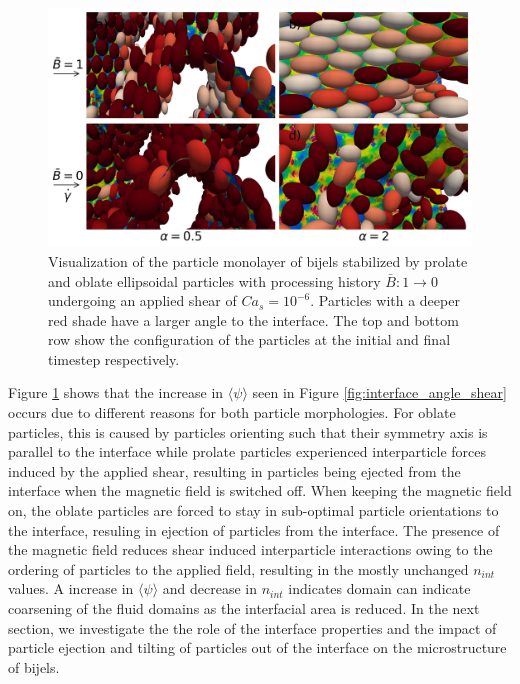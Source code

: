 \begin{figure} 
    \centering 
    \includegraphics[scale=0.4]{../figures/results/paper3/psi_concat_startB-1_endB-0.png} 
    \caption{Visualization of the particle monolayer of bijels stabilized by prolate and oblate ellipsoidal particles with processing history $\bar{B}: 1 \rightarrow 0$
             undergoing an applied shear of $Ca_s = 10^{-6}$. Particles with a deeper red shade have a larger angle to the interface. The top and bottom row show the 
             configuration of the particles at the initial and final timestep respectively.} 
    \label{fig:particle_viz_psi} 
\end{figure}

Figure \ref{fig:particle_viz_psi} shows that the increase in $\langle \psi \rangle$ seen in Figure \ref{fig:interface_angle_shear} occurs due to different
reasons for both particle morphologies. For oblate particles, this is caused by particles orienting such that their symmetry axis is parallel to the interface
while prolate particles experienced interparticle forces induced by the applied shear, resulting in particles being ejected from the interface when the magnetic 
field is switched off. When keeping the magnetic field on, the oblate particles are forced to stay in sub-optimal particle orientations to the interface, resuling
in ejection of particles from the interface. The presence of the magnetic field reduces shear induced interparticle interactions owing to the ordering of
particles to the applied field, resulting in the mostly unchanged $n_{int}$ values. A increase in $\langle \psi \rangle$ and decrease in $n_{int}$ indicates domain
can indicate coarsening of the fluid domains as the interfacial area is reduced. In the next section, we investigate the the role of the interface properties and the 
impact of particle ejection and tilting of particles out of the interface on the microstructure of bijels.

